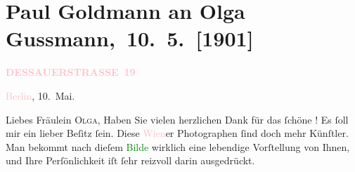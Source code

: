 

\renewcommand{\erwaehntePersonen}{Personen: Hermann Bahr, Paul Goldmann, Ludwig Grillich, Olga Schnitzler}
\renewcommand{\erwaehnteOrte}{Orte: Berlin, Dessauer Straße, Wien, Wörthersee}
\renewcommand{\erwaehnteWerke}{Werke: Maria Magdalena. Ein bürgerliches Trauerspiel in drei Akten, Neue Freie Presse, Neues Wiener Tagblatt, Theater, Kunst und Literatur [Vorstellung des Konservatoriums], [Portraitfoto von Olga Gussmann]}
\section[ Paul Goldmann an Olga Gussmann, 10. 5. {[}1901{]}]{Paul Goldmann an Olga Gussmann, 10. 5. {[}1901{]}}
\nopagebreak{}
\rehead{ }\normalsize\beginnumbering{}
\toendnotes[C]{\smallbreak\pagebreak[2]}
\toendnotes[C]{\smallbreak}
\pstart
           \noindent{}\raggedleft{}{\pb}\textcolor{gray}{\textbf{\textcolor{pink}{DESSAUERSTRASSE 19}{}\ledrightnote{\textcolor{pink}{Dessauer Straße}}}}\pend
           
\pstart
           \textcolor{pink}{Berlin}{}\ledrightnote{\textcolor{pink}{Berlin}}, 10. Mai.\pend
           
\pstart\center{}Liebes Fräulein \textsc{Olga},\pend
\pstart
           Haben Sie vielen herzlichen Dank für das ſchöne \label{K_L03527-1v}\label{K_L03527-1h}! Es ſoll mir ein
               lieber Beſitz ſein. Diese \textcolor{pink}{Wien}{}\ledrightnote{\textcolor{pink}{Wien}}er Photographen ſind
               doch mehr Künſtler. Man bekommt nach dieſem \textcolor{green}{Bilde}{}\ledrightnote{{$\rightarrow$}\textcolor{green}{[Portraitfoto von Olga Gussmann]}} wirklich eine lebendige Vorſtellung von Ihnen, und
               Ihre Perſönlichkeit iſt ſehr reizvoll darin ausgedrückt.\pend
           
